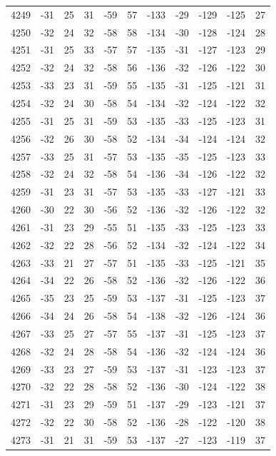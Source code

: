 \begin{table}[H]
\begin{tabular}{lllllllllll}
4249 & -31 & 25 & 31 & -59 & 57 & -133 & -29 & -129 & -125 & 27 \\
4250 & -32 & 24 & 32 & -58 & 58 & -134 & -30 & -128 & -124 & 28 \\
4251 & -31 & 25 & 33 & -57 & 57 & -135 & -31 & -127 & -123 & 29 \\
4252 & -32 & 24 & 32 & -58 & 56 & -136 & -32 & -126 & -122 & 30 \\
4253 & -33 & 23 & 31 & -59 & 55 & -135 & -31 & -125 & -121 & 31 \\
4254 & -32 & 24 & 30 & -58 & 54 & -134 & -32 & -124 & -122 & 32 \\
4255 & -31 & 25 & 31 & -59 & 53 & -135 & -33 & -125 & -123 & 31 \\
4256 & -32 & 26 & 30 & -58 & 52 & -134 & -34 & -124 & -124 & 32 \\
4257 & -33 & 25 & 31 & -57 & 53 & -135 & -35 & -125 & -123 & 33 \\
4258 & -32 & 24 & 32 & -58 & 54 & -136 & -34 & -126 & -122 & 32 \\
4259 & -31 & 23 & 31 & -57 & 53 & -135 & -33 & -127 & -121 & 33 \\
4260 & -30 & 22 & 30 & -56 & 52 & -136 & -32 & -126 & -122 & 32 \\
4261 & -31 & 23 & 29 & -55 & 51 & -135 & -33 & -125 & -123 & 33 \\
4262 & -32 & 22 & 28 & -56 & 52 & -134 & -32 & -124 & -122 & 34 \\
4263 & -33 & 21 & 27 & -57 & 51 & -135 & -33 & -125 & -121 & 35 \\
4264 & -34 & 22 & 26 & -58 & 52 & -136 & -32 & -126 & -122 & 36 \\
4265 & -35 & 23 & 25 & -59 & 53 & -137 & -31 & -125 & -123 & 37 \\
4266 & -34 & 24 & 26 & -58 & 54 & -138 & -32 & -126 & -124 & 36 \\
4267 & -33 & 25 & 27 & -57 & 55 & -137 & -31 & -125 & -123 & 37 \\
4268 & -32 & 24 & 28 & -58 & 54 & -136 & -32 & -124 & -124 & 36 \\
4269 & -33 & 23 & 27 & -59 & 53 & -137 & -31 & -123 & -123 & 37 \\
4270 & -32 & 22 & 28 & -58 & 52 & -136 & -30 & -124 & -122 & 38 \\
4271 & -31 & 23 & 29 & -59 & 51 & -137 & -29 & -123 & -121 & 37 \\
4272 & -32 & 22 & 30 & -58 & 52 & -136 & -28 & -122 & -120 & 38 \\
4273 & -31 & 21 & 31 & -59 & 53 & -137 & -27 & -123 & -119 & 37 \\

\end{tabular}
\end{table}

